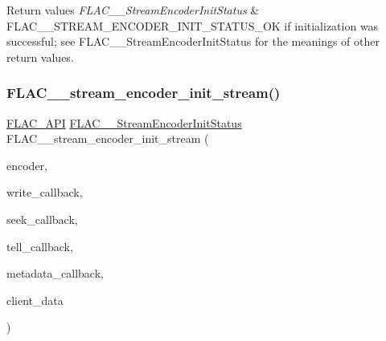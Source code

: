\begin{DoxyRetVals}{Return values}
{\em F\+L\+A\+C\+\_\+\+\_\+\+Stream\+Encoder\+Init\+Status} & {\ttfamily F\+L\+A\+C\+\_\+\+\_\+\+S\+T\+R\+E\+A\+M\+\_\+\+E\+N\+C\+O\+D\+E\+R\+\_\+\+I\+N\+I\+T\+\_\+\+S\+T\+A\+T\+U\+S\+\_\+\+OK} if initialization was successful; see F\+L\+A\+C\+\_\+\+\_\+\+Stream\+Encoder\+Init\+Status for the meanings of other return values. \\
\hline
\end{DoxyRetVals}
\mbox{\label{group__flac__stream__encoder_ga85221c4ceb9f22dfd4983d8f07a9a35b}} 
\subsubsection{\texorpdfstring{F\+L\+A\+C\+\_\+\+\_\+stream\+\_\+encoder\+\_\+init\+\_\+stream()}{FLAC\_\_stream\_encoder\_init\_stream()}}
{\footnotesize\ttfamily \hyperlink{group__flac__export_ga56ca07df8a23310707732b1c0007d6f5}{F\+L\+A\+C\+\_\+\+A\+PI} \hyperlink{group__flac__stream__encoder_ga3bb869620af2b188d77982a5c30b047d}{F\+L\+A\+C\+\_\+\+\_\+\+Stream\+Encoder\+Init\+Status} F\+L\+A\+C\+\_\+\+\_\+stream\+\_\+encoder\+\_\+init\+\_\+stream (\begin{DoxyParamCaption}\item[{\hyperlink{struct_f_l_a_c_____stream_encoder}{F\+L\+A\+C\+\_\+\+\_\+\+Stream\+Encoder} $\ast$}]{encoder,  }\item[{\hyperlink{group__flac__stream__encoder_ga50865125fd57c40fab6eb2f062651429}{F\+L\+A\+C\+\_\+\+\_\+\+Stream\+Encoder\+Write\+Callback}}]{write\+\_\+callback,  }\item[{\hyperlink{group__flac__stream__encoder_ga70b85349d5242e4401c4d8ddf6d9bbca}{F\+L\+A\+C\+\_\+\+\_\+\+Stream\+Encoder\+Seek\+Callback}}]{seek\+\_\+callback,  }\item[{\hyperlink{group__flac__stream__encoder_gabefdf2279e1d0347d9f98f46da4e415b}{F\+L\+A\+C\+\_\+\+\_\+\+Stream\+Encoder\+Tell\+Callback}}]{tell\+\_\+callback,  }\item[{\hyperlink{group__flac__stream__encoder_ga091fbf3340d85bcbda1090c31bc320cf}{F\+L\+A\+C\+\_\+\+\_\+\+Stream\+Encoder\+Metadata\+Callback}}]{metadata\+\_\+callback,  }\item[{\hyperlink{png_8h_ac9c84fa68bbad002983e35ce3663c686}{void} $\ast$}]{client\+\_\+data }\end{DoxyParamCaption})}


